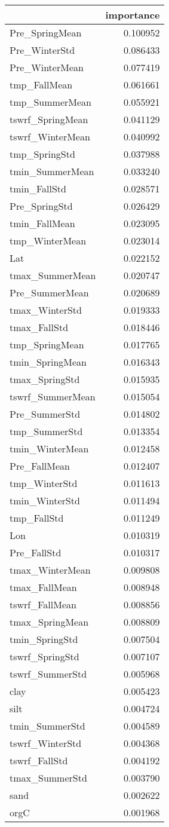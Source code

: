 \begin{tabular}{lr}
\toprule
 & importance \\
\midrule
Pre_SpringMean & 0.100952 \\
Pre_WinterStd & 0.086433 \\
Pre_WinterMean & 0.077419 \\
tmp_FallMean & 0.061661 \\
tmp_SummerMean & 0.055921 \\
tswrf_SpringMean & 0.041129 \\
tswrf_WinterMean & 0.040992 \\
tmp_SpringStd & 0.037988 \\
tmin_SummerMean & 0.033240 \\
tmin_FallStd & 0.028571 \\
Pre_SpringStd & 0.026429 \\
tmin_FallMean & 0.023095 \\
tmp_WinterMean & 0.023014 \\
Lat & 0.022152 \\
tmax_SummerMean & 0.020747 \\
Pre_SummerMean & 0.020689 \\
tmax_WinterStd & 0.019333 \\
tmax_FallStd & 0.018446 \\
tmp_SpringMean & 0.017765 \\
tmin_SpringMean & 0.016343 \\
tmax_SpringStd & 0.015935 \\
tswrf_SummerMean & 0.015054 \\
Pre_SummerStd & 0.014802 \\
tmp_SummerStd & 0.013354 \\
tmin_WinterMean & 0.012458 \\
Pre_FallMean & 0.012407 \\
tmp_WinterStd & 0.011613 \\
tmin_WinterStd & 0.011494 \\
tmp_FallStd & 0.011249 \\
Lon & 0.010319 \\
Pre_FallStd & 0.010317 \\
tmax_WinterMean & 0.009808 \\
tmax_FallMean & 0.008948 \\
tswrf_FallMean & 0.008856 \\
tmax_SpringMean & 0.008809 \\
tmin_SpringStd & 0.007504 \\
tswrf_SpringStd & 0.007107 \\
tswrf_SummerStd & 0.005968 \\
clay & 0.005423 \\
silt & 0.004724 \\
tmin_SummerStd & 0.004589 \\
tswrf_WinterStd & 0.004368 \\
tswrf_FallStd & 0.004192 \\
tmax_SummerStd & 0.003790 \\
sand & 0.002622 \\
orgC & 0.001968 \\
\bottomrule
\end{tabular}
